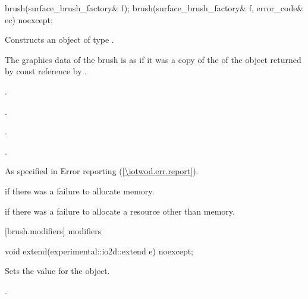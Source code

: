 %
%
%
%
%
%
%
%
\begin{itemdecl}
brush(surface_brush_factory& f);
brush(surface_brush_factory& f, error_code& ec) noexcept;
\end{itemdecl}
\begin{itemdescr}
\pnum
\effects
Constructs an object of type .

\pnum
The graphics data of the brush is as if it was a copy of the \underlyingimagesurface of the  object returned by const reference by .

\pnum
\postconditions
{}.

.

.

.

\pnum
\throws
As specified in Error reporting (\ref{\iotwod.err.report}).

\pnum
\errors
{} if there was a failure to allocate memory.

 if there was a failure to allocate a resource other than memory.
\end{itemdescr}

 [brush.modifiers]{ modifiers}

\begin{itemdecl}
void extend(experimental::io2d::extend e) noexcept;
\end{itemdecl}
\begin{itemdescr}
\pnum
\effects
Sets the  value for the  object.

\pnum
\postconditions
{}.
\end{itemdescr}

